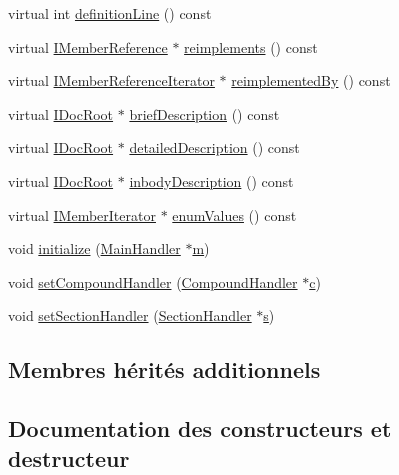 \begin{DoxyCompactItemize}
virtual int \hyperlink{class_member_handler_af222e1207b604f068add22266d90203d}{definition\+Line} () const 
\item 
virtual \hyperlink{class_i_member_reference}{I\+Member\+Reference} $\ast$ \hyperlink{class_member_handler_ad394bac34c3c5ad1dd2235c209e272ff}{reimplements} () const 
\item 
virtual \hyperlink{class_i_member_reference_iterator}{I\+Member\+Reference\+Iterator} $\ast$ \hyperlink{class_member_handler_ad8751803e4991e0ab3dfee7c25f2a10f}{reimplemented\+By} () const 
\item 
virtual \hyperlink{class_i_doc_root}{I\+Doc\+Root} $\ast$ \hyperlink{class_member_handler_a9beeceac92c8245771ea1097607092f0}{brief\+Description} () const 
\item 
virtual \hyperlink{class_i_doc_root}{I\+Doc\+Root} $\ast$ \hyperlink{class_member_handler_a383fbd581441142bda5beefc51e425aa}{detailed\+Description} () const 
\item 
virtual \hyperlink{class_i_doc_root}{I\+Doc\+Root} $\ast$ \hyperlink{class_member_handler_a60cc117f6a924882f5adbca0d9df43a8}{inbody\+Description} () const 
\item 
virtual \hyperlink{class_i_member_iterator}{I\+Member\+Iterator} $\ast$ \hyperlink{class_member_handler_ab0ed31c98f316bdf05968ffc44399af7}{enum\+Values} () const 
\item 
void \hyperlink{class_member_handler_aa5cb3b1084f6b5dcf95cce1a3a8c3001}{initialize} (\hyperlink{class_main_handler}{Main\+Handler} $\ast$\hyperlink{060__command__switch_8tcl_a78d127e8bda64d4471ac811ad512fbd9}{m})
\item 
void \hyperlink{class_member_handler_a6c51c7b8f2e908935b38c5884f1d297c}{set\+Compound\+Handler} (\hyperlink{class_compound_handler}{Compound\+Handler} $\ast$\hyperlink{060__command__switch_8tcl_ab14f56bc3bd7680490ece4ad7815465f}{c})
\item 
void \hyperlink{class_member_handler_ac39c2846f64c32a7311bd15d73587025}{set\+Section\+Handler} (\hyperlink{class_section_handler}{Section\+Handler} $\ast$\hyperlink{060__command__switch_8tcl_a011c73f2dbb87635a3b4206c72355f6e}{s})
\end{DoxyCompactItemize}
\subsection*{Membres hérités additionnels}


\subsection{Documentation des constructeurs et destructeur}
\hypertarget{class_member_handler_ad67f513d872cdef2ca7d6faea8cbeb8b}{}

